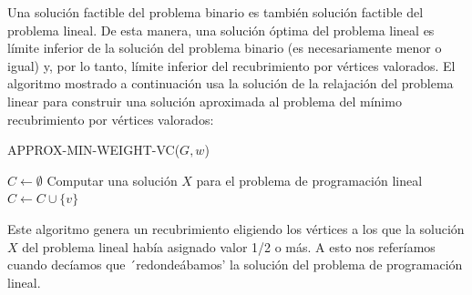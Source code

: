 \documentclass{article}
\begin{document}
		
			
Una solución factible del problema binario es también solución factible del problema lineal. De esta manera, una solución óptima del problema lineal es límite inferior de la solución del problema binario (es necesariamente menor o igual) y, por lo tanto, límite inferior del recubrimiento por vértices valorados. El algoritmo mostrado a continuación usa la solución de la relajación del problema linear para construir una solución aproximada al problema del mínimo recubrimiento por vértices valorados:\\

\begin{algorithm}[H]
\caption{APPROX-MIN-WEIGHT-VC($G,w$)}
\begin{algorithmic}[1]
\STATE $C \gets \emptyset$
\STATE Computar una solución $X$ para el problema de programación lineal
\STATE $C \gets C \cup \{v\}$
\ENDIF
\ENDFOR
{}
\end{algorithmic}
\end{algorithm}

Este algoritmo genera un recubrimiento eligiendo los vértices a los que la solución $X$ del problema lineal había asignado valor 1/2 o más. A esto nos referíamos cuando decíamos que ´redondeábamos' la solución del problema de programación lineal.\\
\end{document}

